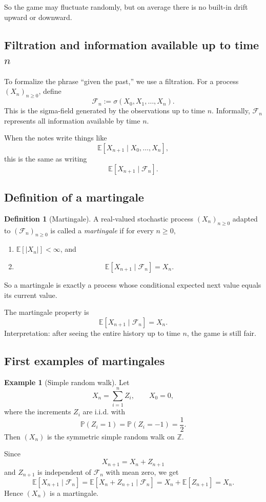 \documentclass[11pt]{article}
\theoremstyle{definition}
\newtheorem{definition}[theorem]{Definition}
\newtheorem{example}[theorem]{Example}
\begin{document}
So the game may fluctuate randomly, but on average there is no built-in drift upward or downward.

\subsection{Filtration and information available up to time \texorpdfstring{$n$}{n}}

To formalize the phrase ``given the past,'' we use a filtration.
For a process \((X_n)_{n\ge 0}\), define
\[
\mathcal F_n:=\sigma(X_0,X_1,\dots,X_n).
\]
This is the sigma-field generated by the observations up to time \(n\). Informally, \(\mathcal F_n\) represents all information available by time \(n\).

When the notes write things like
\[
\mathbb E[X_{n+1}\mid X_0,\dots,X_n],
\]
this is the same as writing
\[
\mathbb E[X_{n+1}\mid \mathcal F_n].
\]

\subsection{Definition of a martingale}

\begin{definition}[Martingale]
A real-valued stochastic process \((X_n)_{n\ge 0}\) adapted to \((\mathcal F_n)_{n\ge 0}\) is called a \emph{martingale} if for every \(n\ge 0\),
\begin{enumerate}[label=(\roman*)]
    \item \(\mathbb E[|X_n|]<\infty\), and
    \item
    \[
    \mathbb E[X_{n+1}\mid \mathcal F_n]=X_n.
    \]
\end{enumerate}
\end{definition}

So a martingale is exactly a process whose conditional expected next value equals its current value.

\begin{keyformula}
The martingale property is
\[
\mathbb E[X_{n+1}\mid \mathcal F_n]=X_n.
\]
Interpretation: after seeing the entire history up to time \(n\), the game is still fair.
\end{keyformula}

\subsection{First examples of martingales}

\begin{example}[Simple random walk]
Let
\[
X_n=\sum_{i=1}^n Z_i,
\qquad X_0=0,
\]
where the increments \(Z_i\) are i.i.d. with
\[
\mathbb P(Z_i=1)=\mathbb P(Z_i=-1)=\frac12.
\]
Then \((X_n)\) is the symmetric simple random walk on \(\mathbb Z\).

Since
\[
X_{n+1}=X_n+Z_{n+1}
\]
and \(Z_{n+1}\) is independent of \(\mathcal F_n\) with mean zero, we get
\[
\mathbb E[X_{n+1}\mid \mathcal F_n]
=
\mathbb E[X_n+Z_{n+1}\mid \mathcal F_n]
=
X_n+\mathbb E[Z_{n+1}]
=
X_n.
\]
Hence \((X_n)\) is a martingale.
\end{example}
\end{document}
